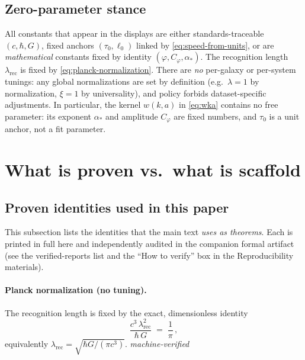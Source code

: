 \documentclass[12pt,a4paper]{article}
\begin{document}
\subsection{Zero-parameter stance}
All constants that appear in the displays are either standards-traceable \((c,\hbar,G)\), fixed anchors \((\tau_0,\ell_0)\) linked by \eqref{eq:speed-from-units}, or are \emph{mathematical} constants fixed by identity \((\varphi, C_\varphi, \alpha_*)\). The recognition length \(\lambda_{\mathrm{rec}}\) is fixed by \eqref{eq:planck-normalization}. There are \emph{no} per-galaxy or per-system tunings: any global normalizations are set by definition (e.g.\ \(\lambda=1\) by normalization, \(\xi=1\) by universality), and policy forbids dataset-specific adjustments. In particular, the kernel \(w(k,a)\) in \eqref{eq:wka} contains no free parameter: its exponent \(\alpha_*\) and amplitude \(C_\varphi\) are fixed numbers, and \(\tau_0\) is a unit anchor, not a fit parameter.

\section{What is proven vs.\ what is scaffold}

\subsection{Proven identities used in this paper}
This subsection lists the identities that the main text \emph{uses as theorems}. Each is printed in full here and independently audited in the companion formal artifact (see the verified-reports list and the ``How to verify'' box in the Reproducibility materials). 

\paragraph{Planck normalization (no tuning).}
The recognition length is fixed by the exact, dimensionless identity
\begin{equation}
  \frac{c^{3}\,\lambda_{\mathrm{rec}}^{2}}{\hbar\,G} \;=\; \frac{1}{\pi}\,,
  \label{eq:planck-id-proof}
\end{equation}
equivalently \(\lambda_{\mathrm{rec}}=\sqrt{\hbar G/(\pi c^{3})}\).
\hfill\emph{machine-verified}
\end{document}
